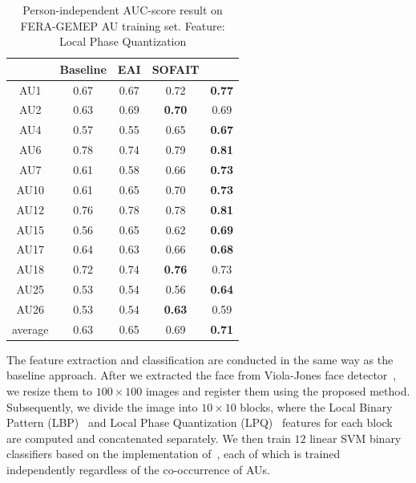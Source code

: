 \documentclass[10pt,journal]{IEEEtran}
\begin{document}
\begin{table}[htbp]
\caption{Person-independent AUC-score result on FERA-GEMEP AU training set. Feature: Local Phase Quantization}
\begin{center}
\label{table:fera_lpq}
\begin{tabular}{|c|cccc|}
\hline
& \pbox{10cm}{Baseline \\\cite{Valstar_FERA11}}	&\pbox{10cm}{EAI \\\cite{Yang_SMCB12}}	&\pbox{10cm}{SOFAIT \\\cite{Yang_FG13}}	&\pbox{10cm}{SOFIT}	\\ \hline
AU1		&0.67	&0.67	&0.72	&\textbf{0.77} \cellcolor[gray]{0.9}\cellcolor[gray]{0.9}	\\
AU2		&0.63	&0.69	&\textbf{0.70}\cellcolor[gray]{0.9}	&0.69	\\
AU4		&0.57	&0.55	&0.65	&\textbf{0.67}\cellcolor[gray]{0.9}	\\
AU6		&0.78	&0.74	&0.79	&\textbf{0.81}\cellcolor[gray]{0.9}	\\
AU7		&0.61	&0.58	&0.66	&\textbf{0.73}\cellcolor[gray]{0.9}	\\
AU10	&0.61	&0.65	&0.70	&\textbf{0.73}\cellcolor[gray]{0.9}	\\
AU12	&0.76	&0.78	&0.78	&\textbf{0.81}\cellcolor[gray]{0.9}	\\
AU15	&0.56	&0.65	&0.62	&\textbf{0.69}\cellcolor[gray]{0.9}	\\
AU17	&0.64	&0.63	&0.66	&\textbf{0.68}\cellcolor[gray]{0.9}	\\
AU18	&0.72	&0.74	&\textbf{0.76}\cellcolor[gray]{0.9}	&0.73	\\
AU25	&0.53	&0.54	&0.56	&\textbf{0.64}\cellcolor[gray]{0.9}	\\
AU26	&0.53	&0.54	&\textbf{0.63}\cellcolor[gray]{0.9}	&0.59	\\	\hline
average	&0.63	&0.65	&0.69	&\textbf{0.71}\cellcolor[gray]{0.9}	\\	\hline

\end{tabular}
\end{center}
\end{table}



The feature extraction and classification are conducted in the same way as the baseline approach. After we extracted the face from Viola-Jones face detector~\cite{Viola_IJCV04}, we resize them to $100\times100$ images and register them using the proposed method. Subsequently, we divide the image into $10\times10$ blocks, where the Local Binary Pattern (LBP)~\cite{Ojala_PAMI02} and Local Phase Quantization (LPQ)~\cite{Ojansivu_ICISP08} features for each block are computed and concatenated separately. We then train $12$ linear SVM binary classifiers based on the implementation of~\cite{SVMlib}, each of which is trained independently regardless of the co-occurrence of AUs.
\end{document}
